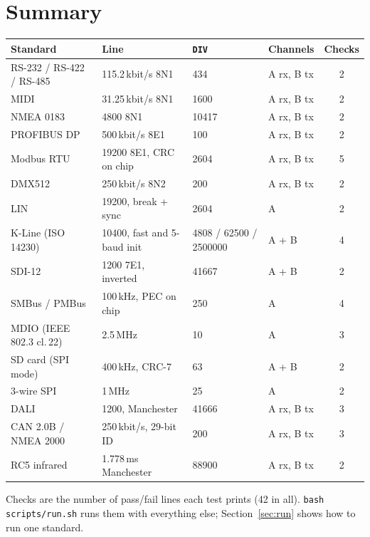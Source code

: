 \documentclass[11pt,a4paper]{article}
\newcommand{\sig}[1]{\texttt{#1}}
\begin{document}
\section{Summary}
\begin{center}\small
\begin{tabular}{@{}l l l l c@{}}
\toprule
Standard & Line & \sig{DIV} & Channels & Checks \\
\midrule
RS-232 / RS-422 / RS-485 & 115.2\,kbit/s 8N1 & 434 & A rx, B tx & 2 \\
MIDI & 31.25\,kbit/s 8N1 & 1600 & A rx, B tx & 2 \\
NMEA 0183 & 4800 8N1 & 10417 & A rx, B tx & 2 \\
PROFIBUS DP & 500\,kbit/s 8E1 & 100 & A rx, B tx & 2 \\
Modbus RTU & 19200 8E1, CRC on chip & 2604 & A rx, B tx & 5 \\
DMX512 & 250\,kbit/s 8N2 & 200 & A rx, B tx & 2 \\
LIN & 19200, break + sync & 2604 & A & 2 \\
K-Line (ISO 14230) & 10400, fast and 5-baud init & 4808 / 62500 / 2500000 & A + B & 4 \\
SDI-12 & 1200 7E1, inverted & 41667 & A + B & 2 \\
SMBus / PMBus & 100\,kHz, PEC on chip & 250 & A & 4 \\
MDIO (IEEE 802.3 cl.\,22) & 2.5\,MHz & 10 & A & 3 \\
SD card (SPI mode) & 400\,kHz, CRC-7 & 63 & A + B & 2 \\
3-wire SPI & 1\,MHz & 25 & A & 2 \\
DALI & 1200, Manchester & 41666 & A rx, B tx & 3 \\
CAN 2.0B / NMEA 2000 & 250\,kbit/s, 29-bit ID & 200 & A rx, B tx & 3 \\
RC5 infrared & 1.778\,ms Manchester & 88900 & A rx, B tx & 2 \\
\bottomrule
\end{tabular}
\end{center}
Checks are the number of pass/fail lines each test prints (42 in all). \sig{bash scripts/run.sh} runs them with everything else; Section~\ref{sec:run} shows how to run one standard.
\end{document}
